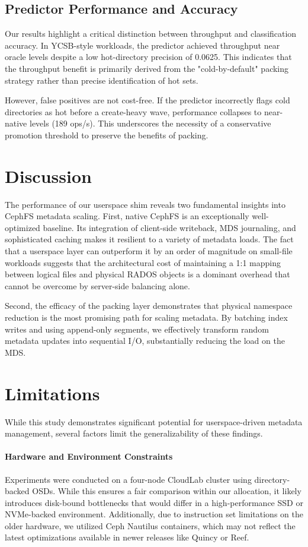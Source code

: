 \documentclass[letterpaper,twocolumn,10pt]{article}
\begin{document}
\subsection{Predictor Performance and Accuracy}
Our results highlight a critical distinction between throughput and classification accuracy. In YCSB-style workloads, the predictor achieved throughput near oracle levels despite a low hot-directory precision of 0.0625. This indicates that the throughput benefit is primarily derived from the "cold-by-default" packing strategy rather than precise identification of hot sets. 

However, false positives are not cost-free. If the predictor incorrectly flags cold directories as hot before a create-heavy wave, performance collapses to near-native levels (189 ops/s). This underscores the necessity of a conservative promotion threshold to preserve the benefits of packing.

\section{Discussion}

The performance of our userspace shim reveals two fundamental insights into CephFS metadata scaling. First, native CephFS is an exceptionally well-optimized baseline. Its integration of client-side writeback, MDS journaling, and sophisticated caching makes it resilient to a variety of metadata loads. The fact that a userspace layer can outperform it by an order of magnitude on small-file workloads suggests that the architectural cost of maintaining a 1:1 mapping between logical files and physical RADOS objects is a dominant overhead that cannot be overcome by server-side balancing alone.

Second, the efficacy of the packing layer demonstrates that physical namespace reduction is the most promising path for scaling metadata. By batching index writes and using append-only segments, we effectively transform random metadata updates into sequential I/O, substantially reducing the load on the MDS.

\section{Limitations}

While this study demonstrates significant potential for userspace-driven metadata management, several factors limit the generalizability of these findings.

\paragraph{Hardware and Environment Constraints} Experiments were conducted on a four-node CloudLab cluster using directory-backed OSDs. While this ensures a fair comparison within our allocation, it likely introduces disk-bound bottlenecks that would differ in a high-performance SSD or NVMe-backed environment. Additionally, due to instruction set limitations on the older hardware, we utilized Ceph Nautilus containers, which may not reflect the latest optimizations available in newer releases like Quincy or Reef.
\end{document}
